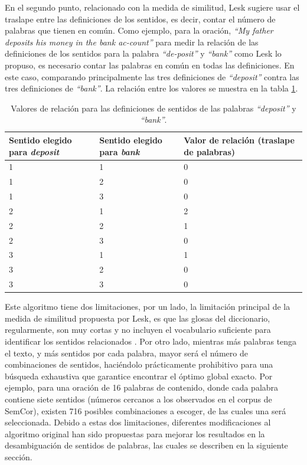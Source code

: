 \clearpage
En el segundo punto, relacionado con la medida de similitud, Lesk sugiere usar el traslape entre las definiciones de los sentidos, es decir, contar el número de palabras que tienen en común.
Como ejemplo, para la oración, \textit{“My father deposits his money in the bank ac-count”} para medir la relación de las definiciones de los sentidos para la palabra \textit{“de-posit”} y \textit{“bank”} como Lesk lo propuso, es necesario contar las palabras en común en todas las definiciones. En este caso, comparando principalmente las tres definiciones de \textit{“deposit”} contra las tres definiciones de \textit{“bank”}. La relación entre los valores se muestra en la tabla \ref{tab:sentidos_palabras}.

  \begin{table}[]
    \centering
      \begin{tabular}{|m{4cm}|m{4cm}|m{4cm}|}
      \hline
      Sentido elegido para \textit{deposit} & Sentido elegido para \textit{bank} & Valor de relación (traslape de palabras)\\
      \hline
      1 & 1 & 0 \\
      \hline
      1 & 2 & 0 \\
      \hline
      1 & 3 & 0 \\
      \hline
      2 & 1 & 2 \\
      \hline
      2 & 2 & 1 \\
      \hline
      2 & 3 & 0 \\
      \hline
      3 & 1 & 1 \\
      \hline
      3 & 2 & 0 \\
      \hline
      3 & 3 & 0 \\
      \hline
     \end{tabular}
   \caption{Valores de relación para las definiciones de sentidos de las palabras \textit{“deposit”} y \textit{“bank”}.\cite{001}}
   \label{tab:sentidos_palabras}
  \end{table}

Este algoritmo tiene dos limitaciones, por un lado, la limitación principal de la medida de similitud propuesta por Lesk, es que las glosas del diccionario, regularmente, son muy cortas y no incluyen el vocabulario suficiente para identificar los sentidos relacionados \cite{003}. Por otro lado, mientras más palabras tenga el texto, y más sentidos por cada palabra, mayor será el número de combinaciones de sentidos, haciéndolo prácticamente prohibitivo para una búsqueda exhaustiva que garantice encontrar el óptimo global exacto. Por ejemplo, para una oración de 16 palabras de contenido, donde cada palabra contiene siete sentidos (números cercanos a los observados en el corpus de SemCor), existen 716 posibles combinaciones a escoger, de las cuales una será seleccionada.
Debido a estas dos limitaciones, diferentes modificaciones al algoritmo original han sido propuestas para mejorar los resultados en la desambiguación de sentidos de palabras, las cuales se describen en la siguiente sección.

